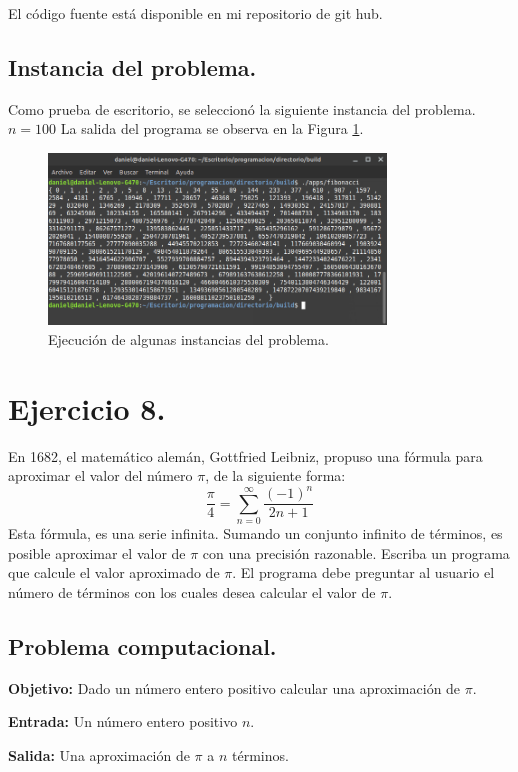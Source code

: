 \documentclass[12pt,letterpaper]{article}
\begin{document}
El código fuente está disponible en mi repositorio de git hub. \cite{url:fibonnaci}

\subsection{Instancia del problema.}
Como prueba de escritorio, se seleccionó la siguiente instancia del problema. $n=100$ La salida del programa se observa en la Figura \ref{fig:fibonnaci}.
\begin{figure}[ht!]
  \centering
  \includegraphics[width=0.8\textwidth]{figures/fibonnaci}
  \caption{Ejecución de algunas instancias del problema.}
  \label{fig:fibonnaci}
\end{figure}


\section{Ejercicio 8.}
\label{ejercicio_8}

En 1682, el matem\'atico alem\'an, Gottfried Leibniz, propuso una f\'ormula para aproximar el valor del n\'umero $\pi$, de la siguiente forma:
$$ \frac{\pi}{4} = \sum_{n=0}^{\infty}\frac{(-1)^n}{2n+1} $$
Esta f\'ormula, es una serie infinita. Sumando un conjunto infinito de t\'erminos, es posible aproximar el valor de $\pi$ con una precisi\'on razonable. Escriba un programa que calcule el valor aproximado de $\pi$. El programa debe preguntar al usuario el n\'umero de t\'erminos con los cuales desea calcular el valor de $\pi$.


\subsection{Problema computacional.}
\textbf{Objetivo:} Dado un n\'umero entero positivo calcular una aproximaci\'on de $\pi$.

\textbf{Entrada:} Un n\'umero entero positivo $n$.

\textbf{Salida:} Una aproximaci\'on de $\pi$ a $n$ t\'erminos.
\end{document}
